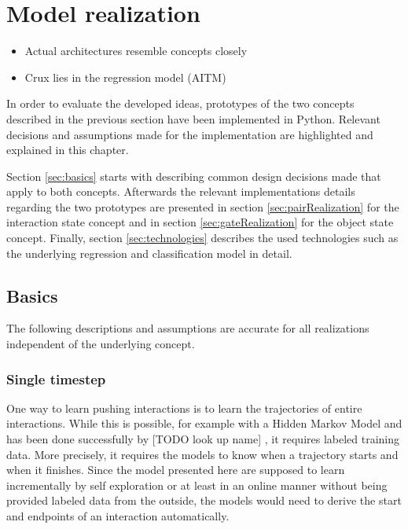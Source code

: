 \chapter{Model realization\label{chap:modelReal}}



\begin{itemize}
	\item Actual architectures resemble concepts closely
	\item Crux lies in the regression model (AITM)
\end{itemize}

In order to evaluate the developed ideas, prototypes of the two concepts described in the previous section have been implemented in Python. Relevant decisions and assumptions made for the implementation are highlighted and explained in this chapter. 

Section \ref{sec:basics} starts with describing common design decisions made that apply to both concepts. Afterwards the relevant implementations details regarding the two prototypes are presented in section \ref{sec:pairRealization} for the interaction state concept and in section \ref{sec:gateRealization} for the object state concept. Finally, section \ref{sec:technologies} describes the used technologies such as the underlying regression and classification model in detail.

\section{Basics \label{sec:basics}}

The following descriptions and assumptions are accurate for all realizations independent of the underlying concept.

\subsection{Single timestep}

One way to learn pushing interactions is to learn the trajectories of entire interactions. While this is possible, for example with a Hidden Markov Model \cite{hmm} and has been done successfully by [TODO look up name] \cite{hmmTrajectory}, it requires labeled training data. More precisely, it requires the models to know when a trajectory starts and when it finishes. Since the model presented here are supposed to learn incrementally by self exploration or at least in an online manner without being provided labeled data from the outside, the models would need to derive the start and endpoints of an interaction automatically. 

